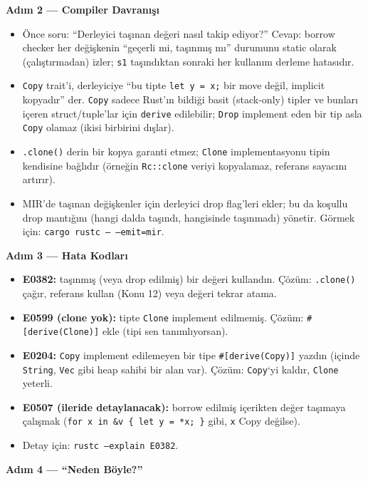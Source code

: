 \documentclass[12pt,a4paper]{article}
\begin{document}
\textbf{Adım 2 --- Compiler Davranışı}

\begin{itemize}
\tightlist
\item
  Önce soru: ``Derleyici taşınan değeri nasıl takip ediyor?'' Cevap: borrow checker her değişkenin ``geçerli mi, taşınmış mı'' durumunu static olarak (çalıştırmadan) izler; \texttt{s1} taşındıktan sonraki her kullanım derleme hatasıdır.
\item
  \texttt{Copy} trait'i, derleyiciye ``bu tipte \texttt{let\ y\ =\ x;} bir move değil, implicit kopyadır'' der. \texttt{Copy} sadece Rust'ın bildiği basit (stack-only) tipler ve bunları içeren struct/tuple'lar için \texttt{derive} edilebilir; \texttt{Drop} implement eden bir tip asla \texttt{Copy} olamaz (ikisi birbirini dışlar).
\item
  \texttt{.clone()} derin bir kopya garanti etmez; \texttt{Clone} implementasyonu tipin kendisine bağlıdır (örneğin \texttt{Rc::clone} veriyi kopyalamaz, referans sayacını artırır).
\item
  MIR'de taşınan değişkenler için derleyici drop flag'leri ekler; bu da koşullu drop mantığını (hangi dalda taşındı, hangisinde taşınmadı) yönetir. Görmek için: \texttt{cargo\ rustc\ --\ --emit=mir}.
\end{itemize}

\textbf{Adım 3 --- Hata Kodları}

\begin{itemize}
\tightlist
\item
  \textbf{E0382:} taşınmış (veya drop edilmiş) bir değeri kullandın. Çözüm: \texttt{.clone()} çağır, referans kullan (Konu 12) veya değeri tekrar atama.
\item
  \textbf{E0599 (clone yok):} tipte \texttt{Clone} implement edilmemiş. Çözüm: \texttt{\#{[}derive(Clone){]}} ekle (tipi sen tanımlıyorsan).
\item
  \textbf{E0204:} \texttt{Copy} implement edilemeyen bir tipe \texttt{\#{[}derive(Copy){]}} yazdın (içinde \texttt{String}, \texttt{Vec} gibi heap sahibi bir alan var). Çözüm: \texttt{Copy}`yi kaldır, \texttt{Clone} yeterli.
\item
  \textbf{E0507 (ileride detaylanacak):} borrow edilmiş içerikten değer taşımaya çalışmak (\texttt{for\ x\ in\ \&v\ \{\ let\ y\ =\ *x;\ \}} gibi, \texttt{x} Copy değilse).
\item
  Detay için: \texttt{rustc\ --explain\ E0382}.
\end{itemize}

\textbf{Adım 4 --- ``Neden Böyle?''}
\end{document}
